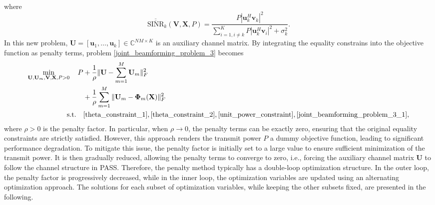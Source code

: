 where 
\begin{equation}
    \overline{\overline{\mathrm{SINR}}}_k(\mathbf{V}, \mathbf{X}, P) = \frac{ P \left| \mathbf{u}_k^H \mathbf{v}_k \right|^2 }{\sum_{i = 1, i \neq k}^K P \left| \mathbf{u}_k^H \mathbf{v}_i \right|^2 + \sigma_k^2 }.
\end{equation}
In this new problem, $\mathbf{U} = [\mathbf{u}_1,\dots,\mathbf{u}_k] \in \mathbb{C}^{NM \times K}$ is an auxiliary channel matrix. By integrating the equality constrains into the objective function as penalty terms, problem \eqref{joint_beamforming_problem_3} becomes
\begin{subequations} \label{joint_beamforming_problem_4}
    \begin{align}
        \min_{\mathbf{U}, \mathbf{U}_m, \mathbf{V}, \mathbf{X}, P > 0} \quad P &+ \frac{1}{\rho} \| \mathbf{U} - \sum_{m=1}^M \mathbf{U}_m \|_F^2 \nonumber \\
        & + \frac{1}{\rho} \sum_{m=1}^M \| \mathbf{U}_m - \mathbf{\Phi}_m(\mathbf{X}) \|_F^2 \\
        \mathrm{s.t.} \quad &\eqref{theta_constraint_1}, \eqref{theta_constraint_2}, \eqref{unit_power_constraint}, \eqref{joint_beamforming_problem_3_1}, 
    \end{align}
\end{subequations}
where $\rho > 0$ is the penalty factor. In particular, when $\rho \to 0$, the penalty terms can be exactly zero, ensuring that the original equality constraints are strictly satisfied. However, this approach renders the transmit power $P$ a dummy objective function, leading to significant performance degradation. To mitigate this issue, the penalty factor is initially set to a large value to ensure sufficient minimization of the transmit power. It is then gradually reduced, allowing the penalty terms to converge to zero, i.e., forcing the auxiliary channel matrix $\mathbf{U}$ to follow the channel structure in PASS. Therefore, the penalty method typically has a double-loop optimization structure. In the outer loop, the penalty factor is progressively decreased, while in the inner loop, the optimization variables are updated using an alternating optimization approach. The solutions for each subset of optimization variables, while keeping the other subsets fixed, are presented in the following.

